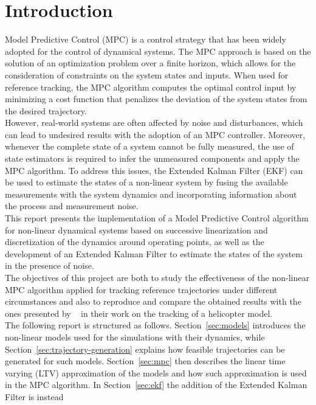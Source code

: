 \documentclass[../main.tex]{subfiles}
\begin{document}
\section{Introduction}

Model Predictive Control (MPC) is a control strategy that has been widely
adopted for the control of dynamical systems. The MPC approach is based on the
solution of an optimization problem over a finite horizon, which allows for the
consideration of constraints on the system states and inputs. When used for
reference tracking, the MPC algorithm
computes the optimal control input by minimizing a cost function that penalizes
the deviation of the system states from the desired trajectory.\\
However, real-world systems are often affected by noise and disturbances, which
can lead to undesired results with the adoption of an MPC controller. Moreover,
whenever the complete state of a system cannot be fully measured, the use of
state estimators is required to infer the unmeasured components and
apply the MPC algorithm.
To address
this issues, the Extended Kalman Filter (EKF) can be used to estimate the states
of a non-linear system by fusing the available measurements with the system
dynamics and incorporating information about the process and measurement
noise.\\
This report presents the implementation of a Model Predictive Control algorithm
for non-linear dynamical systems based on successive linearization and
discretization of the dynamics around operating points, as well as the
development of an Extended Kalman Filter to estimate the states of the system in
the presence of noise.\\
The objectives of this project are both to study the effectiveness of the
non-linear MPC algorithm applied for tracking reference trajectories under
different circumstances and also to reproduce and compare the obtained results
with the ones presented by ~\cite{helicopter} in
their work on the tracking of a helicopter model.\\
The following report is structured as follows. Section~\ref{sec:models}
introduces the non-linear models used for the simulations with their dynamics,
while Section~\ref{sec:trajectory-generation} explains how feasible
trajectories can be generated for such models. Section~\ref{sec:mpc} then
describes the linear time varying (LTV) approximation of the models 
and how such approximation is used in the MPC algorithm. In
Section~\ref{sec:ekf} the addition of the Extended Kalman Filter is instead
\end{document}
